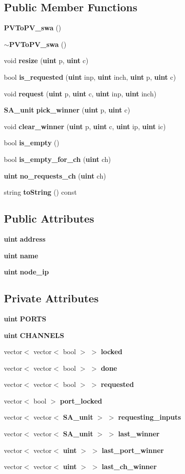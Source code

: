 \subsection*{Public Member Functions}
\begin{CompactItemize}
\item 
{\bf PVToPV\_\-swa} ()
\item 
{\bf $\sim$PVToPV\_\-swa} ()
\item 
void {\bf resize} ({\bf uint} p, {\bf uint} c)
\item 
bool {\bf is\_\-requested} ({\bf uint} inp, {\bf uint} inch, {\bf uint} p, {\bf uint} c)
\item 
void {\bf request} ({\bf uint} p, {\bf uint} c, {\bf uint} inp, {\bf uint} inch)
\item 
{\bf SA\_\-unit} {\bf pick\_\-winner} ({\bf uint} p, {\bf uint} c)
\item 
void {\bf clear\_\-winner} ({\bf uint} p, {\bf uint} c, {\bf uint} ip, {\bf uint} ic)
\item 
bool {\bf is\_\-empty} ()
\item 
bool {\bf is\_\-empty\_\-for\_\-ch} ({\bf uint} ch)
\item 
{\bf uint} {\bf no\_\-requests\_\-ch} ({\bf uint} ch)
\item 
string {\bf toString} () const 
\end{CompactItemize}
\subsection*{Public Attributes}
\begin{CompactItemize}
\item 
{\bf uint} {\bf address}
\item 
{\bf uint} {\bf name}
\item 
{\bf uint} {\bf node\_\-ip}
\end{CompactItemize}
\subsection*{Private Attributes}
\begin{CompactItemize}
\item 
{\bf uint} {\bf PORTS}
\item 
{\bf uint} {\bf CHANNELS}
\item 
vector$<$ vector$<$ bool $>$ $>$ {\bf locked}
\item 
vector$<$ vector$<$ bool $>$ $>$ {\bf done}
\item 
vector$<$ vector$<$ bool $>$ $>$ {\bf requested}
\item 
vector$<$ bool $>$ {\bf port\_\-locked}
\item 
vector$<$ vector$<$ {\bf SA\_\-unit} $>$ $>$ {\bf requesting\_\-inputs}
\item 
vector$<$ vector$<$ {\bf SA\_\-unit} $>$ $>$ {\bf last\_\-winner}
\item 
vector$<$ vector$<$ {\bf uint} $>$ $>$ {\bf last\_\-port\_\-winner}
\item 
vector$<$ vector$<$ {\bf uint} $>$ $>$ {\bf last\_\-ch\_\-winner}
\end{CompactItemize}


